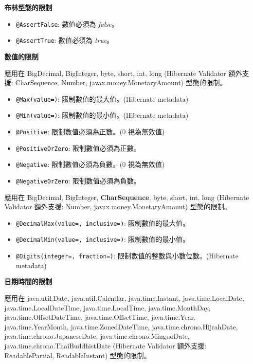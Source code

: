 \noindent\textbf{布林型態的限制}

\begin{itemize}
\item \texttt{@AssertFalse}: 數值必須為 \textit{false}。
\item \texttt{@AssertTrue}: 數值必須為 \textit{true}。
\end{itemize}

\noindent\textbf{數值的限制}\vspace{10pt}

應用在 BigDecimal, BigInteger, byte, short, int, long (Hibernate Validator 額外支援: CharSequence, Number, javax.money.MonetaryAmount) 型態的限制。

\begin{itemize}
\item \texttt{@Max(value=)}: 限制數值的最大值。(Hibernate metadata)
\item \texttt{@Min(value=)}: 限制數值的最小值。(Hibernate metadata)
\item \texttt{@Positive}: 限制數值必須為正數。(0 視為無效值)
\item \texttt{@PositiveOrZero}: 限制數值必須為正數。
\item \texttt{@Negative}: 限制數值必須為負數。(0 視為無效值)
\item \texttt{@NegativeOrZero}: 限制數值必須為負數。
\end{itemize}

應用在 BigDecimal, BigInteger, \textbf{CharSequence}, byte, short, int, long (Hibernate Validator 額外支援: Number, javax.money.MonetaryAmount) 型態的限制。

\begin{itemize}
\item \texttt{@DecimalMax(value=, inclusive=)}: 限制數值的最大值。
\item \texttt{@DecimalMin(value=, inclusive=)}: 限制數值的最小值。
\item \texttt{@Digits(integer=, fraction=)}: 限制數值的整數與小數位數。(Hibernate metadata)
\end{itemize}

\noindent\textbf{日期時間的限制}\vspace{10pt}

應用在 java.util.Date, java.util.Calendar, java.time.Instant, java.time.LocalDate, java.time.LocalDateTime, java.time.LocalTime, java.time.MonthDay, java.time.OffsetDateTime, java.time.OffsetTime, java.time.Year, java.{\allowbreak}time.YearMonth, java.time.ZonedDateTime, java.time.chrono.HijrahDate, java.time.chrono.JapaneseDate,{\linebreak} java.time.chrono.MinguoDate, java.time.chrono.ThaiBuddhistDate (Hibernate Validator 額外支援: ReadablePartial, ReadableInstant) 型態的限制。

